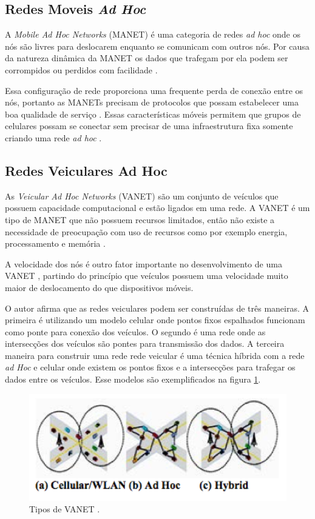  \subsection{Redes Moveis \emph{Ad Hoc}}
A \emph{Mobile Ad Hoc Networks} (MANET) é uma categoria de redes \emph{ad hoc} \cite{Rezende:2008} onde os nós são livres para deslocarem enquanto se comunicam com outros nós. Por causa da natureza dinâmica da MANET os dados que trafegam por ela podem ser corrompidos ou perdidos com facilidade \cite{Bai:2003}.

Essa configuração de rede proporciona uma frequente perda de conexão entre os nós, portanto as MANETs precisam de protocolos que possam estabelecer uma boa qualidade de serviço \cite{Bai:2003}. Essas características móveis permitem que grupos de celulares possam se conectar sem precisar de uma infraestrutura fixa somente criando uma rede \emph{ad hoc} \cite{Piorkowski:2009}.

 \subsection{Redes Veiculares Ad Hoc}



As \emph{Veicular Ad Hoc Networks} (VANET) são um conjunto de veículos que possuem capacidade computacional e estão ligados em uma rede. A VANET é um tipo de MANET que não possuem recursos limitados, então não existe a necessidade de preocupação com uso de recursos como por exemplo energia, processamento e memória \cite{Loulloudes:2010}.

A velocidade dos nós é outro fator importante no desenvolvimento de uma VANET \cite{Kumar:2011}, partindo do princípio que veículos possuem uma velocidade muito maior de deslocamento do que dispositivos móveis. 

O autor \cite{Kumar:2011} afirma que as redes veiculares podem ser construídas de três maneiras. A primeira é utilizando um modelo celular onde pontos fixos espalhados funcionam como ponte para conexão dos veículos. O segundo é uma rede onde as intersecções dos veículos são pontes para transmissão dos dados. A terceira maneira para construir uma rede rede veicular é uma técnica híbrida com a rede \emph{ad Hoc} e celular onde existem os pontos fixos e a intersecções para trafegar os dados entre os veículos. Esse modelos são exemplificados na figura \ref{fig:fig28}.

\begin{figure}[htbp]
	\centering
		\includegraphics[scale=0.4]{referencial/figuras/Figure28.png}
	\caption{Tipos de VANET \cite{Kumar:2011}.}
	\label{fig:fig28}
\end{figure}

